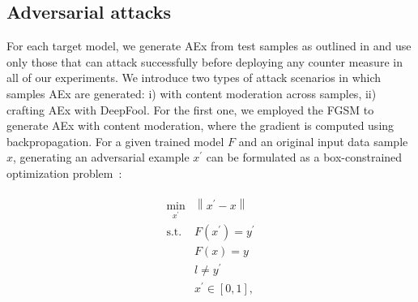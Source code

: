 \subsection{Adversarial attacks}
For each target model, we generate AEx from test samples as outlined in  and use only those that can attack successfully before deploying any counter measure in all of our experiments. 
We introduce two types of attack scenarios in which samples AEx are generated: i) with content moderation across samples, ii) crafting AEx with DeepFool.
For the first one, we employed the FGSM to generate AEx with content moderation, where the gradient is computed using backpropagation. For a given trained model $F$ and an original input data sample $x$, generating an adversarial example $x^{\prime}$ can be formulated as a box-constrained optimization problem~\cite{yuan2019adversarial}:

\vspace{-6mm}
\begin{align}
    \begin{array}{cl}
        \min _{x^{\prime}} & \left\|x^{\prime}-x\right\| \\
        \text {s.t.} & F\left(x^{\prime}\right)=y^{\prime} \\
        & F(x)=y \\
        & l \neq y^{\prime} \\
        & x^{\prime} \in[0,1],
    \end{array}
\end{align}

